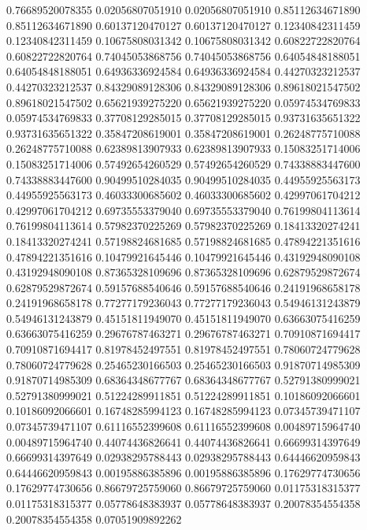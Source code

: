    0.76689520078355   0.02056807051910
   0.02056807051910   0.85112634671890
   0.85112634671890   0.60137120470127
   0.60137120470127   0.12340842311459
   0.12340842311459   0.10675808031342
   0.10675808031342   0.60822722820764
   0.60822722820764   0.74045053868756
   0.74045053868756   0.64054848188051
   0.64054848188051   0.64936336924584
   0.64936336924584   0.44270323212537
   0.44270323212537   0.84329089128306
   0.84329089128306   0.89618021547502
   0.89618021547502   0.65621939275220
   0.65621939275220   0.05974534769833
   0.05974534769833   0.37708129285015
   0.37708129285015   0.93731635651322
   0.93731635651322   0.35847208619001
   0.35847208619001   0.26248775710088
   0.26248775710088   0.62389813907933
   0.62389813907933   0.15083251714006
   0.15083251714006   0.57492654260529
   0.57492654260529   0.74338883447600
   0.74338883447600   0.90499510284035
   0.90499510284035   0.44955925563173
   0.44955925563173   0.46033300685602
   0.46033300685602   0.42997061704212
   0.42997061704212   0.69735553379040
   0.69735553379040   0.76199804113614
   0.76199804113614   0.57982370225269
   0.57982370225269   0.18413320274241
   0.18413320274241   0.57198824681685
   0.57198824681685   0.47894221351616
   0.47894221351616   0.10479921645446
   0.10479921645446   0.43192948090108
   0.43192948090108   0.87365328109696
   0.87365328109696   0.62879529872674
   0.62879529872674   0.59157688540646
   0.59157688540646   0.24191968658178
   0.24191968658178   0.77277179236043
   0.77277179236043   0.54946131243879
   0.54946131243879   0.45151811949070
   0.45151811949070   0.63663075416259
   0.63663075416259   0.29676787463271
   0.29676787463271   0.70910871694417
   0.70910871694417   0.81978452497551
   0.81978452497551   0.78060724779628
   0.78060724779628   0.25465230166503
   0.25465230166503   0.91870714985309
   0.91870714985309   0.68364348677767
   0.68364348677767   0.52791380999021
   0.52791380999021   0.51224289911851
   0.51224289911851   0.10186092066601
   0.10186092066601   0.16748285994123
   0.16748285994123   0.07345739471107
   0.07345739471107   0.61116552399608
   0.61116552399608   0.00489715964740
   0.00489715964740   0.44074436826641
   0.44074436826641   0.66699314397649
   0.66699314397649   0.02938295788443
   0.02938295788443   0.64446620959843
   0.64446620959843   0.00195886385896
   0.00195886385896   0.17629774730656
   0.17629774730656   0.86679725759060
   0.86679725759060   0.01175318315377
   0.01175318315377   0.05778648383937
   0.05778648383937   0.20078354554358
   0.20078354554358   0.07051909892262
